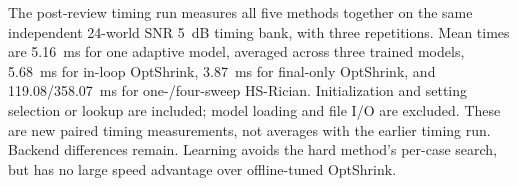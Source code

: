 The post-review timing run measures all five methods together on the
same independent 24-world SNR 5~dB timing bank, with three repetitions.
Mean times are 5.16~ms for one adaptive model,
averaged across three trained models, 5.68~ms
for in-loop OptShrink, 3.87~ms for final-only
OptShrink, and 119.08/358.07~ms
for one-/four-sweep HS-Rician. Initialization and setting selection or
lookup are included; model loading and file I/O are excluded. These are
new paired timing measurements, not averages with the earlier timing run.
Backend differences remain. Learning avoids the hard method's per-case
search, but has no large speed advantage over offline-tuned OptShrink.
